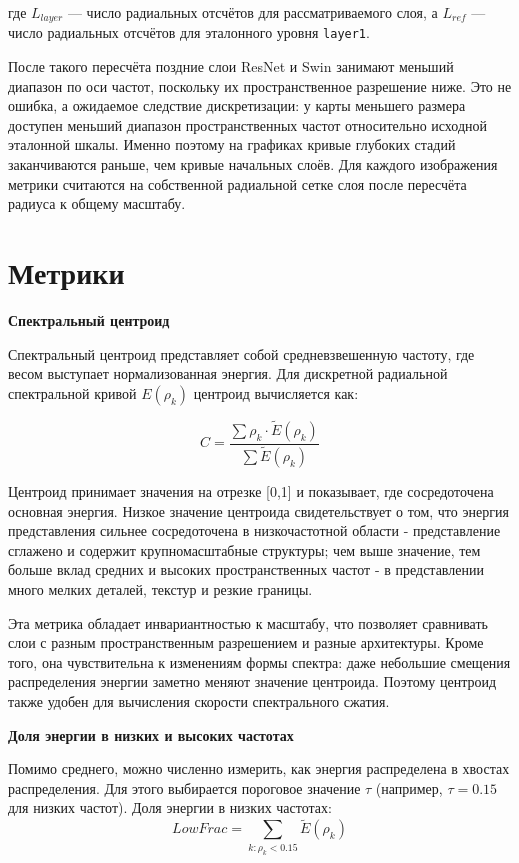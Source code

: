 где $L_{layer}$ — число радиальных отсчётов для рассматриваемого слоя, а $L_{ref}$ — число радиальных отсчётов для эталонного уровня \texttt{layer1}. 

После такого пересчёта поздние слои ResNet и Swin занимают меньший диапазон по оси частот, поскольку их пространственное разрешение ниже. Это не ошибка, а ожидаемое следствие дискретизации: у карты меньшего размера доступен меньший диапазон пространственных частот относительно исходной эталонной шкалы. Именно поэтому на графиках кривые глубоких стадий заканчиваются раньше, чем кривые начальных слоёв. Для каждого изображения метрики считаются на собственной радиальной сетке слоя после пересчёта радиуса к общему масштабу. 
 
\section{Метрики}

\textbf{Спектральный центроид}

Спектральный центроид представляет собой средневзвешенную частоту, где весом выступает нормализованная энергия. Для дискретной радиальной спектральной кривой $E(\rho_k)$ центроид вычисляется как:

\begin{equation}
    C = \frac{\sum \rho_k \cdot \tilde E(\rho_k)}{\sum \tilde E(\rho_k)}
\end{equation}

Центроид принимает значения на отрезке [0,1] и показывает, где сосредоточена основная энергия. Низкое значение центроида свидетельствует о том, что энергия представления сильнее сосредоточена в низкочастотной области - представление сглажено и содержит крупномасштабные структуры; чем выше значение, тем больше вклад средних и высоких пространственных частот - в представлении много мелких деталей, текстур и резкие границы.

Эта метрика обладает инвариантностью к масштабу, что позволяет сравнивать слои с разным пространственным разрешением и разные архитектуры. Кроме того, она чувствительна к изменениям формы спектра: даже небольшие смещения распределения энергии заметно меняют значение центроида. Поэтому центроид также удобен для вычисления скорости спектрального сжатия.

\textbf{Доля энергии в низких и высоких частотах}

Помимо среднего, можно численно измерить, как энергия распределена в хвостах распределения. Для этого выбирается пороговое значение $\tau$ (например, $\tau = 0.15$ для низких частот). Доля энергии в низких частотах:
\begin{equation}
    LowFrac = \sum_{k:\rho_k<0.15} \tilde E(\rho_k)
\end{equation}


